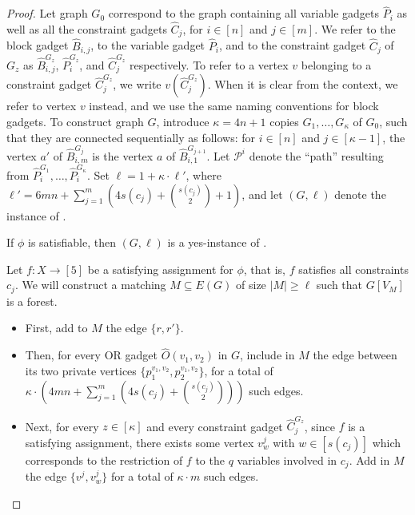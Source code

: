 \begin{proof}
        Let graph $G_0$ correspond to the graph containing all variable gadgets $\hat{P}_i$ as well as all the constraint gadgets $\hat{C}_j$,
        for $i \in [n]$ and $j \in [m]$.
        We refer to the block gadget $\hat{B}_{i,j}$, to the variable gadget $\hat{P}_i$,
        and to the constraint gadget $\hat{C}_j$ of $G_z$
        as $\hat{B}^{G_z}_{i,j}$, $\hat{P}^{G_z}_i$, and $\hat{C}^{G_z}_j$ respectively.
        To refer to a vertex $v$ belonging to a constraint gadget $\hat{C}^{G_z}_j$, we write $v(\hat{C}^{G_z}_j)$.
        When it is clear from the context, we refer to vertex $v$ instead,
        and we use the same naming conventions for block gadgets.
        To construct graph $G$, introduce $\kappa = 4n + 1$ copies $G_1, \ldots, G_\kappa$ of $G_0$,
        such that they are connected sequentially as follows:
        for $i \in [n]$ and $j \in [\kappa - 1]$,
        the vertex $a'$ of $\hat{B}^{G_j}_{i,m}$ is the vertex $a$ of $\hat{B}^{G_{j+1}}_{i,1}$.
        Let $\mathcal{P}^i$ denote the ``path'' resulting from $\hat{P}^{G_1}_i, \ldots, \hat{P}^{G_\kappa}_i$.
        Set $\ell = 1 + \kappa \cdot \ell'$, where $\ell' =  6m n + \sum_{j=1}^m \left(4s(c_j) + \binom{s(c_j)}{2} + 1 \right)$,
        and let $(G,\ell)$ denote the instance of \AcyclicM.


        \begin{lemma}\label{lem:acyclic:lb:csp->acyclic}
            If $\phi$ is satisfiable,
            then $(G,\ell)$ is a yes-instance of \AcyclicM.
        \end{lemma}

        \begin{nestedproof}
            Let $f \colon X \to [5]$ be a satisfying assignment for $\phi$, that is, $f$ satisfies all constraints $c_j$.
            We will construct a matching $M \subseteq E(G)$ of size $|M| \geq \ell$ such that $G[V_M]$ is a forest.
            \begin{itemize}
                \item First, add to $M$ the edge $\{r,r'\}$.

                \item Then, for every OR gadget $\hat{O}(v_1,v_2)$ in $G$, include in $M$ the edge between
                its two private vertices $\{p^{v_1,v_2}_1,p^{v_1,v_2}_2\}$,
                for a total of $\kappa \cdot \left(4 m n + \sum_{j=1}^m \left(4 s(c_j) + \binom{s(c_j)}{2}\right)\right)$ such edges.

                \item Next, for every $z \in [\kappa]$ and every constraint gadget $\hat{C}^{G_z}_j$, since $f$ is a satisfying assignment,
                there exists some vertex $v^j_w$ with $w \in [s(c_j)]$ which corresponds to the restriction
                of $f$ to the $q$ variables involved in $c_j$.
                Add in $M$ the edge $\{v^j,v^j_w\}$ for a total of $\kappa \cdot m$ such edges.


\end{itemize}
\end{nestedproof}
\end{proof}
